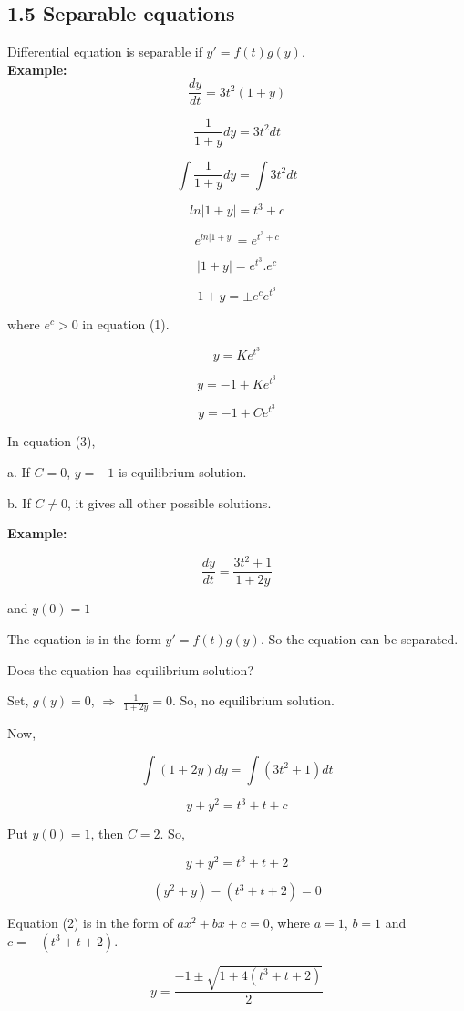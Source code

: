 \documentclass[
  11pt,
]{article}
\begin{document}
\subsection{1.5 Separable equations}\label{separable-equations}

Differential equation is separable if \(y'=f(t)g(y)\).\\

\textbf{Example:} \[\frac{dy}{dt} = 3t^2(1+y)\]

\[
\frac{1}{1+y}dy = 3t^2dt \tag{1}
\]

\[
\int\frac{1}{1+y}dy = \int3t^2dt
\]

\[
ln|{1+y}|=t^3 + c
\]

\[
e^{ln|1+y|}=e^{t^3+c}
\]

\[
|1+y|=e^{t^3}.e^c 
\]

\[
1+y = \pm e^ce^{t^3} \tag{2}
\]

where \(e^c>0\) in equation (1).

\[
y = Ke^{t^3}
\]

\[
y = -1 + Ke^{t^3}
\]

\[
y = -1 + Ce^{t^3} \tag{3}
\]

In equation (3),

a. If \(C = 0\), \(y=-1\) is equilibrium solution.

b. If \(C \neq 0\), it gives all other possible solutions.

\textbf{Example:}

\[
\frac{dy}{dt}=\frac{3t^2+1}{1+2y}
\]

and \(y(0) = 1\)

The equation is in the form \(y'=f(t)g(y)\). So the equation can be
separated.

Does the equation has equilibrium solution?

Set, \(g(y) = 0\), \(\Longrightarrow\) \(\frac{1}{1+2y} = 0\). So, no
equilibrium solution.

Now,

\[
\int(1+2y)dy=\int(3t^2+1)dt
\]

\[
y+y^2=t^3+t+c \tag{1}
\]

Put \(y(0) = 1\), then \(C = 2\). So,

\[
y+y^2=t^3+t+2
\]

\[
(y^2+y)-(t^3+t+2)=0 \tag{2}
\]

Equation (2) is in the form of \(ax^2+bx+c = 0\), where \(a = 1\),
\(b = 1\) and \(c = -(t^3+t+2)\).

\[
y = \frac{-1\pm\sqrt{1+4(t^3+t+2)}}{2}
\]
\end{document}
